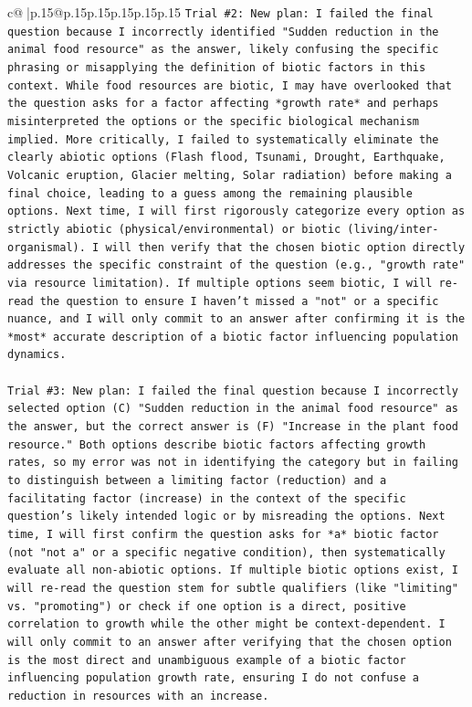 \documentclass{article}
\begin{document}
{\begin{supertabular}{c@{$\;$}|p{.15\linewidth}@{}p{.15\linewidth}p{.15\linewidth}p{.15\linewidth}p{.15\linewidth}p{.15\linewidth}}
{{{\texttt{Trial \#2: New plan: I failed the final question because I incorrectly identified "Sudden reduction in the animal food resource" as the answer, likely confusing the specific phrasing or misapplying the definition of biotic factors in this context. While food resources are biotic, I may have overlooked that the question asks for a factor affecting *growth rate* and perhaps misinterpreted the options or the specific biological mechanism implied. More critically, I failed to systematically eliminate the clearly abiotic options (Flash flood, Tsunami, Drought, Earthquake, Volcanic eruption, Glacier melting, Solar radiation) before making a final choice, leading to a guess among the remaining plausible options. Next time, I will first rigorously categorize every option as strictly abiotic (physical/environmental) or biotic (living/inter{-}organismal). I will then verify that the chosen biotic option directly addresses the specific constraint of the question (e.g., "growth rate" via resource limitation). If multiple options seem biotic, I will re{-}read the question to ensure I haven't missed a "not" or a specific nuance, and I will only commit to an answer after confirming it is the *most* accurate description of a biotic factor influencing population dynamics.} \\
\\ 
\texttt{Trial \#3: New plan: I failed the final question because I incorrectly selected option (C) "Sudden reduction in the animal food resource" as the answer, but the correct answer is (F) "Increase in the plant food resource." Both options describe biotic factors affecting growth rates, so my error was not in identifying the category but in failing to distinguish between a limiting factor (reduction) and a facilitating factor (increase) in the context of the specific question's likely intended logic or by misreading the options. Next time, I will first confirm the question asks for *a* biotic factor (not "not a" or a specific negative condition), then systematically evaluate all non{-}abiotic options. If multiple biotic options exist, I will re{-}read the question stem for subtle qualifiers (like "limiting" vs. "promoting") or check if one option is a direct, positive correlation to growth while the other might be context{-}dependent. I will only commit to an answer after verifying that the chosen option is the most direct and unambiguous example of a biotic factor influencing population growth rate, ensuring I do not confuse a reduction in resources with an increase.} \\
}}}
\end{supertabular}}
\end{document}
